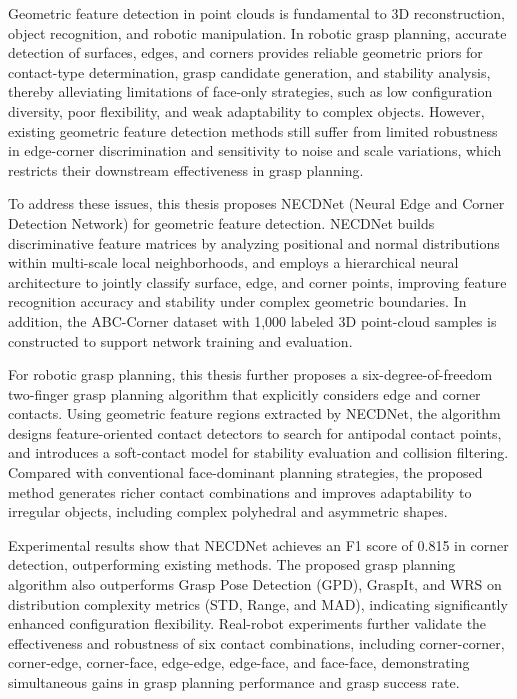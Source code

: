 \begin{eabstract}
Geometric feature detection in point clouds is fundamental to 3D reconstruction, object recognition, and robotic manipulation. In robotic grasp planning, accurate detection of surfaces, edges, and corners provides reliable geometric priors for contact-type determination, grasp candidate generation, and stability analysis, thereby alleviating limitations of face-only strategies, such as low configuration diversity, poor flexibility, and weak adaptability to complex objects. However, existing geometric feature detection methods still suffer from limited robustness in edge-corner discrimination and sensitivity to noise and scale variations, which restricts their downstream effectiveness in grasp planning.

To address these issues, this thesis proposes NECDNet (Neural Edge and Corner Detection Network) for geometric feature detection. NECDNet builds discriminative feature matrices by analyzing positional and normal distributions within multi-scale local neighborhoods, and employs a hierarchical neural architecture to jointly classify surface, edge, and corner points, improving feature recognition accuracy and stability under complex geometric boundaries. In addition, the ABC-Corner dataset with 1,000 labeled 3D point-cloud samples is constructed to support network training and evaluation.

For robotic grasp planning, this thesis further proposes a six-degree-of-freedom two-finger grasp planning algorithm that explicitly considers edge and corner contacts. Using geometric feature regions extracted by NECDNet, the algorithm designs feature-oriented contact detectors to search for antipodal contact points, and introduces a soft-contact model for stability evaluation and collision filtering. Compared with conventional face-dominant planning strategies, the proposed method generates richer contact combinations and improves adaptability to irregular objects, including complex polyhedral and asymmetric shapes.

Experimental results show that NECDNet achieves an F1 score of 0.815 in corner detection, outperforming existing methods. The proposed grasp planning algorithm also outperforms Grasp Pose Detection (GPD), GraspIt, and WRS on distribution complexity metrics (STD, Range, and MAD), indicating significantly enhanced configuration flexibility. Real-robot experiments further validate the effectiveness and robustness of six contact combinations, including corner-corner, corner-edge, corner-face, edge-edge, edge-face, and face-face, demonstrating simultaneous gains in grasp planning performance and grasp success rate.
\end{eabstract}


